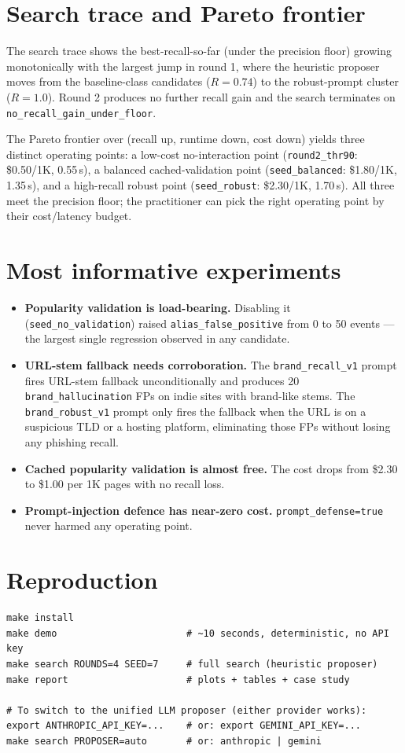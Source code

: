 \documentclass[10pt,conference]{IEEEtran}
\begin{document}
\section{Search trace and Pareto frontier}
The search trace shows the best-recall-so-far (under the precision floor)
growing monotonically with the largest jump in round 1, where the
heuristic proposer moves from the baseline-class candidates ($R\!=\!0.74$)
to the robust-prompt cluster ($R\!=\!1.0$). Round 2 produces no further
recall gain and the search terminates on
\texttt{no\_recall\_gain\_under\_floor}.

The Pareto frontier over (recall up, runtime down, cost down) yields three
distinct operating points: a low-cost no-interaction point
(\texttt{round2\_thr90}: \$0.50/1K, 0.55\,s), a balanced cached-validation
point (\texttt{seed\_balanced}: \$1.80/1K, 1.35\,s), and a high-recall
robust point (\texttt{seed\_robust}: \$2.30/1K, 1.70\,s). All three meet
the precision floor; the practitioner can pick the right operating point
by their cost/latency budget.

\section{Most informative experiments}
\begin{itemize}
    \item \textbf{Popularity validation is load-bearing.} Disabling it
    (\texttt{seed\_no\_validation}) raised \texttt{alias\_false\_positive}
    from 0 to 50 events --- the largest single regression observed in any
    candidate.
    \item \textbf{URL-stem fallback needs corroboration.} The
    \texttt{brand\_recall\_v1} prompt fires URL-stem fallback
    unconditionally and produces 20 \texttt{brand\_hallucination} FPs
    on indie sites with brand-like stems. The \texttt{brand\_robust\_v1}
    prompt only fires the fallback when the URL is on a suspicious TLD or
    a hosting platform, eliminating those FPs without losing any phishing
    recall.
    \item \textbf{Cached popularity validation is almost free.} The cost
    drops from \$2.30 to \$1.00 per 1K pages with no recall loss.
    \item \textbf{Prompt-injection defence has near-zero cost.}
    \texttt{prompt\_defense=true} never harmed any operating point.
\end{itemize}

\section{Reproduction}
\begin{lstlisting}[basicstyle=\ttfamily\scriptsize]
make install
make demo                       # ~10 seconds, deterministic, no API key
make search ROUNDS=4 SEED=7     # full search (heuristic proposer)
make report                     # plots + tables + case study

# To switch to the unified LLM proposer (either provider works):
export ANTHROPIC_API_KEY=...    # or: export GEMINI_API_KEY=...
make search PROPOSER=auto       # or: anthropic | gemini
\end{lstlisting}
\end{document}
